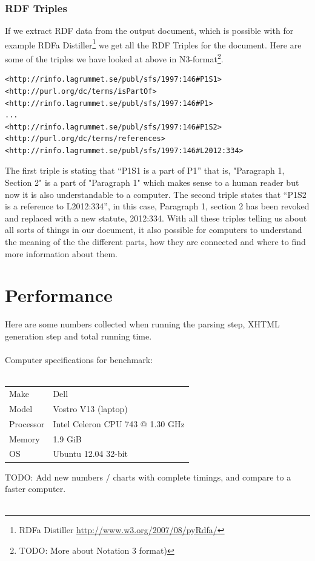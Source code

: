 \subsubsection{RDF Triples}
If we extract RDF data from the output document, which is possible with for example RDFa Distiller\footnote{RDFa Distiller \url{http://www.w3.org/2007/08/pyRdfa/}} we get all the RDF Triples for the document. Here are some of the triples we have looked at above in N3-format\footnote{TODO: More about Notation 3 format)}.\\
\begin{verbatim}
<http://rinfo.lagrummet.se/publ/sfs/1997:146#P1S1> 
<http://purl.org/dc/terms/isPartOf>
<http://rinfo.lagrummet.se/publ/sfs/1997:146#P1>
...
<http://rinfo.lagrummet.se/publ/sfs/1997:146#P1S2>
<http://purl.org/dc/terms/references>
<http://rinfo.lagrummet.se/publ/sfs/1997:146#L2012:334>
\end{verbatim}
\linebreak
\newline
The first triple is stating that “P1S1 is a part of P1” that is, "Paragraph 1, Section 2" is a part of "Paragraph 1" which makes sense to a human reader but now it is also understandable to a computer. The second triple states that “P1S2 is a reference to L2012:334”, in this case, Paragraph 1, section 2 has been revoked and replaced with a new statute, 2012:334. With all these triples telling us about all sorts of things in our document, it also possible for computers to understand the meaning of the the different parts, how they are connected and where to find more information about them.

\section{Performance}
Here are some numbers collected when running the parsing step, XHTML generation step and total running time.\\\\
Computer specifications for benchmark:\\\\ 
\begin{tabular}{l l}
Make & Dell\\
Model & Vostro V13 (laptop)\\
Processor & Intel Celeron CPU 743 @ 1.30 GHz\\
Memory & 1.9 GiB\\
OS & Ubuntu 12.04 32-bit\\
\end{tabular}
\linebreak
\newline
TODO: Add new numbers / charts with complete timings, and compare to a faster computer.\\\\

